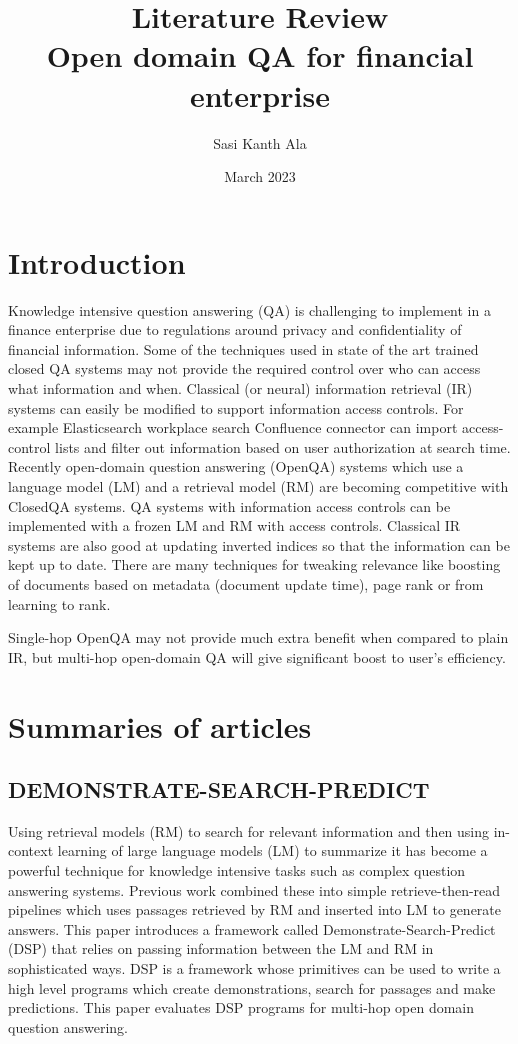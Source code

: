 \documentclass{article}
\title{Literature Review \\
       \large Open domain QA for financial enterprise}
\author{Sasi Kanth Ala}
\date{March 2023}
\begin{document}
\maketitle

\section{Introduction}
 Knowledge intensive question answering (QA) is challenging to implement in a finance enterprise due to regulations around privacy and confidentiality of financial information. Some of the techniques used in state of the art trained closed QA systems may not provide the required control over who can access what information and when. Classical (or neural) information retrieval (IR) systems can easily be modified to support information access controls. For example Elasticsearch workplace search Confluence connector can import access-control lists and filter out information based on user authorization at search time. Recently open-domain question answering (OpenQA) systems which use a language model (LM) and a retrieval model (RM) are becoming competitive with ClosedQA systems. QA systems with information access controls can be implemented with a frozen LM and RM with access controls. Classical IR systems are also good at updating inverted indices so that the information can be kept up to date. There are many techniques for tweaking relevance like boosting of documents based on metadata (document update time), page rank or from learning to rank. 

Single-hop OpenQA may not provide much extra benefit when compared to plain IR, but multi-hop open-domain QA will give significant boost to user's efficiency.

\section{Summaries of articles}
  \subsection{DEMONSTRATE-SEARCH-PREDICT \cite{https://doi.org/10.48550/arxiv.2212.14024}}
Using retrieval models (RM) to search for relevant information and then using in-context learning of large language models (LM) to summarize it has become a powerful technique for knowledge intensive tasks such as complex question answering systems. Previous work combined these into simple retrieve-then-read pipelines which uses passages retrieved by RM and inserted into LM to generate answers. This paper introduces a framework called Demonstrate-Search-Predict (DSP) that relies on passing information between the LM and RM in sophisticated ways. DSP is a framework whose primitives can be used to write a high level programs which create demonstrations, search for passages and make predictions. This paper evaluates DSP programs for multi-hop open domain question answering.
\end{document}
